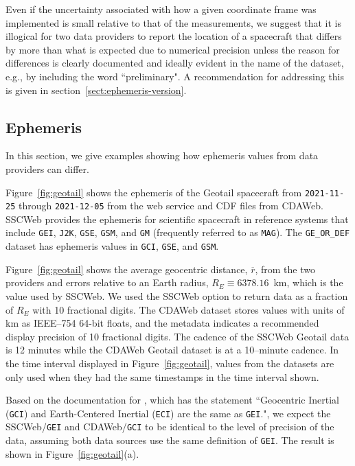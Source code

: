 \documentclass[draft]{agujournal2019}
\begin{document}
Even if the uncertainty associated with how a given coordinate frame was implemented is small relative to that of the measurements, we suggest that it is illogical for two data providers to report the location of a spacecraft that differs by more than what is expected due to numerical precision unless the reason for differences is clearly documented and ideally evident in the name of the dataset, e.g., by including the word ``preliminary". A recommendation for addressing this is given in section~\ref{sect:ephemeris-version}.


\subsection{Ephemeris}
\label{sect:comparisons_ephemeris}

In this section, we give examples showing how ephemeris values from data providers can differ.

Figure~\ref{fig:geotail} shows the ephemeris of the Geotail spacecraft from \texttt{2021-11-25} through \texttt{2021-12-05} from the  web service and CDF \cite{CDF2025} files from CDAWeb. SSCWeb provides the ephemeris for scientific spacecraft in reference systems that include \texttt{GEI}, \texttt{J2K}, \texttt{GSE}, \texttt{GSM}, and \texttt{GM} (frequently referred to as \texttt{MAG}). The \texttt{GE\_OR\_DEF} dataset has ephemeris values in \texttt{GCI}, \texttt{GSE}, and \texttt{GSM}.

Figure~\ref{fig:geotail} shows the average geocentric distance, $\overline{r}$, from the two providers and errors relative to an Earth radius, $R_E\equiv 6378.16$~km, which is the value used by SSCWeb. We used the SSCWeb option to return data as a fraction of $R_E$ with 10 fractional digits. The CDAWeb dataset stores values with units of km as IEEE--754 64-bit floats, and the metadata indicates a recommended display precision of 10 fractional digits. The cadence of the SSCWeb Geotail data is 12 minutes while the CDAWeb Geotail dataset is at a 10--minute cadence. In the time interval displayed in Figure~\ref{fig:geotail}, values from the datasets are only used when they had the same timestamps in the time interval shown.

Based on the documentation for , which has the statement ``Geocentric Inertial (\texttt{GCI}) and Earth-Centered Inertial (\texttt{ECI}) are the same as \texttt{GEI}.", we expect the SSCWeb/\texttt{GEI} and CDAWeb/\texttt{GCI} to be identical to the level of precision of the data, assuming both data sources use the same definition of \texttt{GEI}. The result is shown in Figure~\ref{fig:geotail}(a). 
\end{document}
